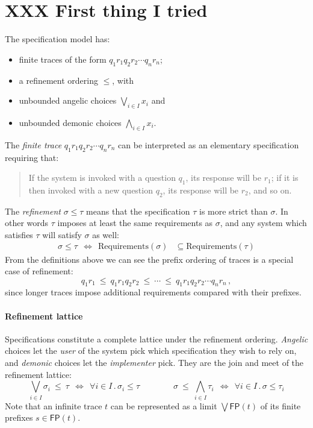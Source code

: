 \documentclass[11pt]{article}
\begin{document}




\section*{XXX First thing I tried}

The specification model has:
\begin{itemize}
  \item finite traces of the form $q_1 r_1 q_2 r_2 \cdots q_n r_n$;
  \item a refinement ordering $\le$, with
  \item unbounded angelic choices $\bigvee_{i \in I} x_i$ and
  \item unbounded demonic choices $\bigwedge_{i \in I} x_i$.
\end{itemize}
The \emph{finite trace} $q_1 r_1 q_2 r_2 \cdots q_n r_n$
can be interpreted as an elementary specification requiring that:
\begin{quote}
  If the system is invoked with a question $q_1$,
  its response will be $r_1$;
  if it is then invoked with a new question $q_2$,
  its response will be $r_2$,
  and so on.
\end{quote}
The \emph{refinement} $\sigma \le \tau$
means that the specification $\tau$ is more strict than $\sigma$.
In other words $\tau$ imposes at least the same requirements as $\sigma$,
and any system which satisfies $\tau$ will satisfy $\sigma$ as well:
\begin{align*}
  \sigma \le \tau
  \:\:\Longleftrightarrow\:\:
  \mathrm{Requirements}(\sigma) &\subseteq
  \mathrm{Requirements}(\tau)
\end{align*}
From the definitions above we can see
the prefix ordering of traces is a special case of refinement:
\[
  q_1 r_1 \:\le\: q_1 r_1 q_2 r_2 \:\le\: \cdots \:\le\: q_1 r_1 q_2 r_2 \cdots q_n r_n
  \,,
\]
since longer traces impose additional requirements
compared with their prefixes.


\paragraph{Refinement lattice}

Specifications constitute a complete lattice under the refinement ordering.
\emph{Angelic} choices let the \emph{user} of the system
pick which specification they wish to rely on,
and \emph{demonic} choices let the \emph{implementer} pick.
They are the join and meet of the refinement lattice:
\[
  \bigvee_{i \in I} \sigma_i \:\le\: \tau
  \:\:\Leftrightarrow\:\:
  \forall i \in I \mathbin. \sigma_i \le \tau
  \qquad \qquad
  \sigma \:\le\: \bigwedge_{i \in I} \tau_i
  \:\:\Leftrightarrow\:\:
  \forall i \in I \mathbin. \sigma \le \tau_i
\]
Note that
an infinite trace $t$ can be represented as
a limit $\bigvee \mathsf{FP}(t)$ of its finite prefixes
$s \in \mathsf{FP}(t)$.
\end{document}
